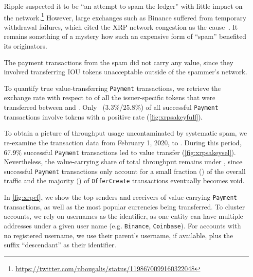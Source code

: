 Ripple suspected it to be ``an attempt to spam the ledger'' with little impact on the network.\footnote{\url{https://twitter.com/nbougalis/status/1198670099160322048}}
However, large exchanges such as Binance suffered from temporary  withdrawal failures, which cited the XRP network congestion as the cause~\cite{AtoZMarkets2019}.
It remains something of a mystery how such an expensive form of ``spam'' benefited its originators.

The payment transactions from the spam did not carry any value, since they involved transferring  IOU tokens unacceptable outside of the spammer's network.

To quantify true value-transferring \texttt{Payment} transactions, we retrieve the exchange rate with respect to  of all the issuer-specific tokens that were transferred between \startdate and \finishdate.
Only~ (3.3\%/25.8\%) of all successful \texttt{Payment} transactions involve tokens with a positive  rate (\autoref{fig:xrpsakeyfull}).

To obtain a picture of throughput usage uncontaminated by systematic spam, we re-examine the transaction data from February 1, 2020, to \finishdate. During this period, 67.9\% successful \texttt{Payment} transactions led to value transfer (\autoref{fig:xrpsakeysel}). Nevertheless, the value-carrying share of total throughput remains under , since successful \texttt{Payment} transactions only account for a small fraction () of the overall traffic and the majority () of \texttt{OfferCreate} transactions eventually becomes void.








In \autoref{fig:xrpcf}, we show the top senders and receivers of value-carrying \texttt{Payment} transactions, as well as the most popular currencies being transferred.
To cluster accounts, we rely on usernames as the identifier, as one entity can have multiple addresses under a given user name (e.g. \texttt{Binance}, \texttt{Coinbase}).
For accounts with no registered username, we use their parent's username, if available, plus the suffix ``descendant'' as their identifier.

